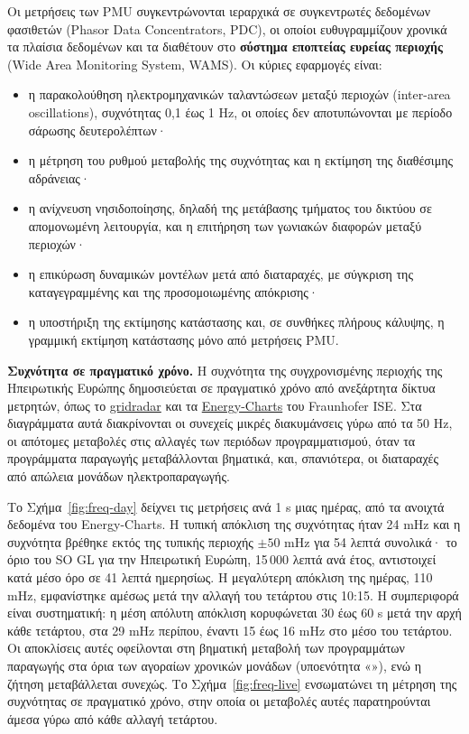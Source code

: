 Οι μετρήσεις των PMU συγκεντρώνονται ιεραρχικά σε συγκεντρωτές δεδομένων φασιθετών (Phasor
Data Concentrators, PDC), οι οποίοι ευθυγραμμίζουν χρονικά τα πλαίσια δεδομένων και τα
διαθέτουν στο \textbf{σύστημα εποπτείας ευρείας περιοχής} (Wide Area Monitoring System,
WAMS). Οι κύριες εφαρμογές είναι:

\begin{itemize}
\item η παρακολούθηση ηλεκτρομηχανικών ταλαντώσεων μεταξύ περιοχών (inter-area
      oscillations), συχνότητας 0,1 έως 1 Hz, οι οποίες δεν αποτυπώνονται με περίοδο
      σάρωσης δευτερολέπτων·
\item η μέτρηση του ρυθμού μεταβολής της συχνότητας και η εκτίμηση της διαθέσιμης
      αδράνειας·
\item η ανίχνευση νησιδοποίησης, δηλαδή της μετάβασης τμήματος του δικτύου σε απομονωμένη
      λειτουργία, και η επιτήρηση των γωνιακών διαφορών μεταξύ περιοχών·
\item η επικύρωση δυναμικών μοντέλων μετά από διαταραχές, με σύγκριση της καταγεγραμμένης
      και της προσομοιωμένης απόκρισης·
\item η υποστήριξη της εκτίμησης κατάστασης και, σε συνθήκες πλήρους κάλυψης, η
      γραμμική εκτίμηση κατάστασης μόνο από μετρήσεις PMU.
\end{itemize}

\textbf{Συχνότητα σε πραγματικό χρόνο.} Η συχνότητα της συγχρονισμένης περιοχής της
Ηπειρωτικής Ευρώπης δημοσιεύεται σε πραγματικό χρόνο από ανεξάρτητα δίκτυα μετρητών, όπως το
\href{https://gridradar.net/en/mains-frequency}{gridradar} και τα
\href{https://www.energy-charts.info/charts/frequency/chart.htm?l=en}{Energy-Charts} του
Fraunhofer ISE. Στα διαγράμματα αυτά διακρίνονται οι συνεχείς μικρές διακυμάνσεις γύρω από τα
50 Hz, οι απότομες μεταβολές στις αλλαγές των περιόδων προγραμματισμού, όταν τα προγράμματα
παραγωγής μεταβάλλονται βηματικά, και, σπανιότερα, οι διαταραχές από απώλεια μονάδων
ηλεκτροπαραγωγής.

Το Σχήμα~\ref{fig:freq-day} δείχνει τις μετρήσεις ανά 1 s μιας ημέρας, από τα ανοιχτά
δεδομένα του Energy-Charts. Η τυπική απόκλιση της συχνότητας ήταν 24 mHz και η συχνότητα
βρέθηκε εκτός της τυπικής περιοχής $\pm 50$ mHz για 54 λεπτά συνολικά· το όριο του SO GL για
την Ηπειρωτική Ευρώπη, 15\,000 λεπτά ανά έτος, αντιστοιχεί κατά μέσο όρο σε 41 λεπτά ημερησίως.
Η μεγαλύτερη απόκλιση της ημέρας, 110 mHz, εμφανίστηκε αμέσως μετά την αλλαγή του τετάρτου
στις 10:15. Η συμπεριφορά είναι συστηματική: η μέση απόλυτη απόκλιση κορυφώνεται 30 έως 60 s
μετά την αρχή κάθε τετάρτου, στα 29 mHz περίπου, έναντι 15 έως 16 mHz στο μέσο του τετάρτου.
Οι αποκλίσεις αυτές οφείλονται στη βηματική μεταβολή των προγραμμάτων παραγωγής στα όρια των
αγοραίων χρονικών μονάδων (υποενότητα «»), ενώ η ζήτηση μεταβάλλεται συνεχώς.
Το Σχήμα~\ref{fig:freq-live} ενσωματώνει τη μέτρηση της συχνότητας σε πραγματικό χρόνο, στην
οποία οι μεταβολές αυτές παρατηρούνται άμεσα γύρω από κάθε αλλαγή τετάρτου.

